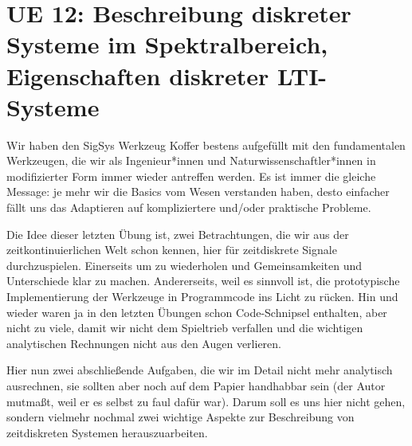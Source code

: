 \newpage
\section{UE 12: Beschreibung diskreter Systeme im Spektralbereich, Eigenschaften diskreter LTI-Systeme}

Wir haben den SigSys Werkzeug Koffer bestens aufgefüllt mit den fundamentalen
Werkzeugen, die wir als Ingenieur*innen und Naturwissenschaftler*innen
in modifizierter Form immer wieder antreffen werden.
Es ist immer die gleiche Message: je mehr wir
die Basics vom Wesen verstanden haben, desto einfacher fällt uns das Adaptieren auf
kompliziertere und/oder praktische Probleme.

Die Idee dieser letzten Übung ist, zwei Betrachtungen, die wir aus der
zeitkontinuierlichen Welt schon kennen, hier für zeitdiskrete Signale
durchzuspielen. Einerseits um zu wiederholen und Gemeinsamkeiten und Unterschiede
klar zu machen. Andererseits, weil es sinnvoll ist,
die prototypische Implementierung der Werkzeuge in Programmcode
ins Licht zu rücken.
Hin und wieder waren ja in den letzten Übungen schon Code-Schnipsel
enthalten, aber nicht zu viele, damit wir nicht dem Spieltrieb verfallen und
die wichtigen analytischen Rechnungen nicht aus den Augen verlieren.

Hier nun zwei abschließende Aufgaben, die wir im Detail nicht mehr analytisch
ausrechnen, sie sollten aber noch auf dem Papier
handhabbar sein (der Autor mutmaßt, weil er es selbst zu faul dafür war).
Darum soll es uns hier nicht gehen, sondern vielmehr nochmal zwei wichtige
Aspekte zur Beschreibung von zeitdiskreten Systemen herauszuarbeiten.





\clearpage
